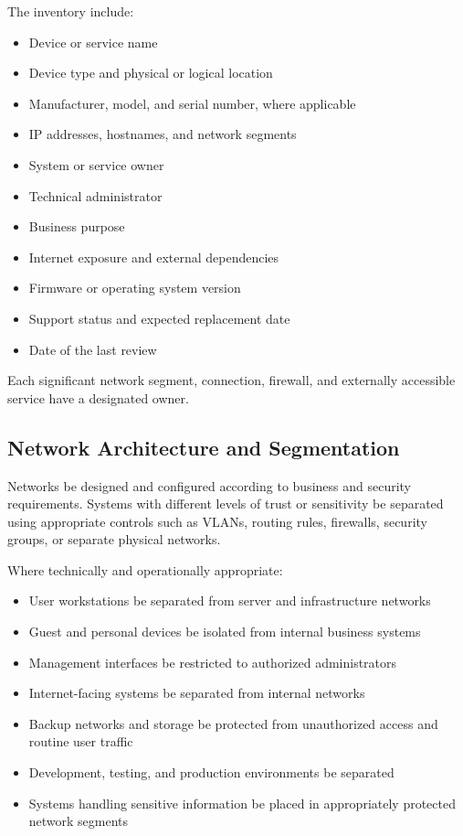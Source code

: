 The inventory \should{} include:
\begin{itemize}
    \item Device or service name
    \item Device type and physical or logical location
    \item Manufacturer, model, and serial number, where applicable
    \item IP addresses, hostnames, and network segments
    \item System or service owner
    \item Technical administrator
    \item Business purpose
    \item Internet exposure and external dependencies
    \item Firmware or operating system version
    \item Support status and expected replacement date
    \item Date of the last review
\end{itemize}

Each significant network segment, connection, firewall, and externally accessible service \must{} have a designated owner.

\subsection{Network Architecture and Segmentation}

Networks \must{} be designed and configured according to business and security requirements. Systems with different levels of trust or sensitivity \should{} be separated using appropriate controls such as VLANs, routing rules, firewalls, security groups, or separate physical networks.

Where technically and operationally appropriate:
\begin{itemize}
    \item User workstations \should{} be separated from server and infrastructure networks
    \item Guest and personal devices \must{} be isolated from internal business systems
    \item Management interfaces \must{} be restricted to authorized administrators
    \item Internet-facing systems \must{} be separated from internal networks
    \item Backup networks and storage \should{} be protected from unauthorized access and routine user traffic
    \item Development, testing, and production environments \should{} be separated
    \item Systems handling sensitive information \should{} be placed in appropriately protected network segments
\end{itemize}

